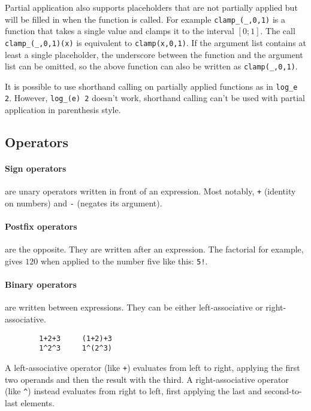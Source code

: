 \documentclass[10pt]{article}
\begin{document}
    Partial application also supports placeholders that are not partially applied but will be filled in when the function is called.
    For example \verb|clamp_(_,0,1)| is a function that takes a single value and clamps it to the interval $ [0;1] $.
    The call \verb|clamp_(_,0,1)(x)| is equivalent to \verb|clamp(x,0,1)|.
    If the argument list contains at least a single placeholder, the underscore between the function and the argument list can be omitted, so the above function can also be written as \verb|clamp(_,0,1)|.

    It is possible to use shorthand calling on partially applied functions as in \verb|log_e 2|.
    However, \verb|log_(e) 2| doesn't work, shorthand calling can't be used with partial application in parenthesis style.
    
    \subsection{Operators}\label{subsec:sign-operators}
    \paragraph{Sign operators} are unary operators written in front of an expression.
    Most notably, \verb|+| {\small(identity on numbers)} and \verb|-| {\small(negates its argument)}.

    \paragraph{Postfix operators} are the opposite.
    They are written after an expression.
    The factorial for example, gives $ 120 $ when applied to the number five like this: \verb|5!|.
    
    \paragraph{Binary operators} are written between expressions.
    They can be either left-associative or right-associative.
    \begin{verbatim}
        1+2+3     (1+2)+3
        1^2^3     1^(2^3)
    \end{verbatim}
    A left-associative operator {\small(like \verb|+|)} evaluates from left to right, applying the first two operands and then the result with the third.
    A right-associative operator {\small(like \verb|^|)} instead evaluates from right to left, first applying the last and second-to-last elements.
\end{document}
